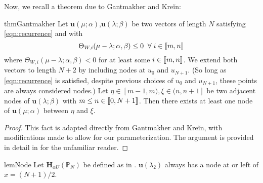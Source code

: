     Now, we recall a theorem due to Gantmakher and Kre\u{i}n:\cite{gantmakher2002oscillation}
    \begin{restatable}{thm}{Gantmakher}\label{thm:Gantmakher}
      Let $\mathbf{u}(\mu;\alpha)$,$\mathbf{u}(\lambda;\beta)$ be two vectors of length $N$ satisfying \cref{eqn:recurrence} and with
      \begin{equation} \label{eqn:rest}
	      \Theta_{W,i}(\mu-\lambda;\alpha,\beta) \leq 0 \;\; \text{$\forall \; i \in \left \llbracket m , n \right \rrbracket$}
      \end{equation}
      where $\Theta_{W,i}(\mu-\lambda;\alpha,\beta) < 0$ for at least some $i \in \left \llbracket m , n \right \rrbracket$. We extend both vectors to length $N+2$ by including nodes at $u_0$ and $u_{N+1}$. (So long as \cref{eqn:recurrence} is satisfied, despite previous choices of $u_0$ and $u_{N+1}$, these points are always considered nodes.) Let $\eta \in [m-1,m), \xi \in (n,n+1]$ be two adjacent nodes of $\mathbf{u}(\lambda;\beta)$ with $m \leq n \in \left \llbracket 0 , N+1 \right \rrbracket$. Then there exists at least one node of $\mathbf{u}(\mu;\alpha)$ between $\eta$ and $\xi$.
    \end{restatable}
    \begin{proof}
    	This fact is adapted directly from Gantmakher and Kre\u{i}n, with modifications made to allow for our parameterization. The argument is provided in detail in  for the unfamiliar reader.
    \end{proof}
  \begin{restatable}{lem}{Node}\label{lem:node_left}
      Let $\mathbf{H}_{\alpha U}(\mathbb{P}_N)$ be defined as in . $\mathbf{u}(\lambda_2)$ always has a node at or left of $x=(N+1)/2$.
  \end{restatable}
